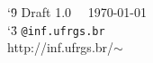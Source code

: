%
%

\begin{center}
	\catcode`\=9
	Draft 1.0 ~~\today  \\
	\catcode`\=3
	\texttt{\myUser @inf.ufrgs.br}\\
	http://inf.ufrgs.br/$\sim$\myUser
\end{center}
